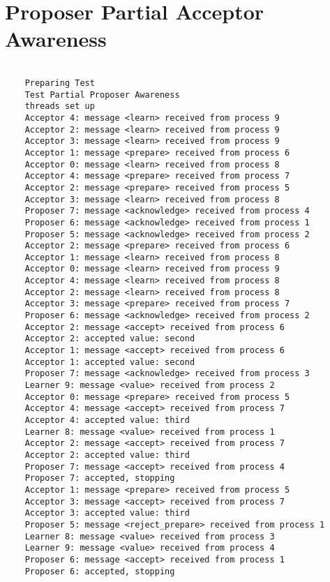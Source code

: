 \documentclass[a4paper, 12pt]{article}
\begin{document}
\section{Proposer Partial Acceptor Awareness}\label{app:partial}

\begin{lstlisting}

    Preparing Test
    Test Partial Proposer Awareness
    threads set up
    Acceptor 4: message <learn> received from process 9
    Acceptor 2: message <learn> received from process 9
    Acceptor 3: message <learn> received from process 9
    Acceptor 1: message <prepare> received from process 6
    Acceptor 0: message <learn> received from process 8
    Acceptor 4: message <prepare> received from process 7
    Acceptor 2: message <prepare> received from process 5
    Acceptor 3: message <learn> received from process 8
    Proposer 7: message <acknowledge> received from process 4
    Proposer 6: message <acknowledge> received from process 1
    Proposer 5: message <acknowledge> received from process 2
    Acceptor 2: message <prepare> received from process 6
    Acceptor 1: message <learn> received from process 8
    Acceptor 0: message <learn> received from process 9
    Acceptor 4: message <learn> received from process 8
    Acceptor 2: message <learn> received from process 8
    Acceptor 3: message <prepare> received from process 7
    Proposer 6: message <acknowledge> received from process 2
    Acceptor 2: message <accept> received from process 6
    Acceptor 2: accepted value: second
    Acceptor 1: message <accept> received from process 6
    Acceptor 1: accepted value: second
    Proposer 7: message <acknowledge> received from process 3
    Learner 9: message <value> received from process 2
    Acceptor 0: message <prepare> received from process 5
    Acceptor 4: message <accept> received from process 7
    Acceptor 4: accepted value: third
    Learner 8: message <value> received from process 1
    Acceptor 2: message <accept> received from process 7
    Acceptor 2: accepted value: third
    Proposer 7: message <accept> received from process 4
    Proposer 7: accepted, stopping
    Acceptor 1: message <prepare> received from process 5
    Acceptor 3: message <accept> received from process 7
    Acceptor 3: accepted value: third
    Proposer 5: message <reject_prepare> received from process 1
    Learner 8: message <value> received from process 3
    Learner 9: message <value> received from process 4
    Proposer 6: message <accept> received from process 1
    Proposer 6: accepted, stopping

\end{lstlisting}
\end{document}
